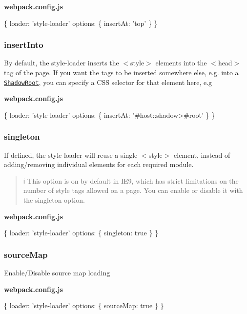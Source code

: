 {\bfseries webpack.\+config.\+js} 
\begin{DoxyCode}
\{
  loader: 'style-loader'
  options: \{
    insertAt: 'top'
  \}
\}
\end{DoxyCode}


\subsubsection*{{\ttfamily insert\+Into}}

By default, the style-\/loader inserts the {\ttfamily $<$style$>$} elements into the {\ttfamily $<$head$>$} tag of the page. If you want the tags to be inserted somewhere else, e.\+g. into a \href{https://developer.mozilla.org/en-US/docs/Web/API/ShadowRoot}{\tt Shadow\+Root}, you can specify a C\+SS selector for that element here, e.\+g

{\bfseries webpack.\+config.\+js} 
\begin{DoxyCode}
\{
  loader: 'style-loader'
  options: \{
    insertAt: '#host::shadow>#root'
  \}
\}
\end{DoxyCode}


\subsubsection*{{\ttfamily singleton}}

If defined, the style-\/loader will reuse a single {\ttfamily $<$style$>$} element, instead of adding/removing individual elements for each required module.

\begin{quote}
ℹ️ This option is on by default in I\+E9, which has strict limitations on the number of style tags allowed on a page. You can enable or disable it with the singleton option. \end{quote}


{\bfseries webpack.\+config.\+js} 
\begin{DoxyCode}
\{
  loader: 'style-loader'
  options: \{
    singleton: true
  \}
\}
\end{DoxyCode}


\subsubsection*{{\ttfamily source\+Map}}

Enable/\+Disable source map loading

{\bfseries webpack.\+config.\+js} 
\begin{DoxyCode}
\{
  loader: 'style-loader'
  options: \{
    sourceMap: true
  \}
\}
\end{DoxyCode}


